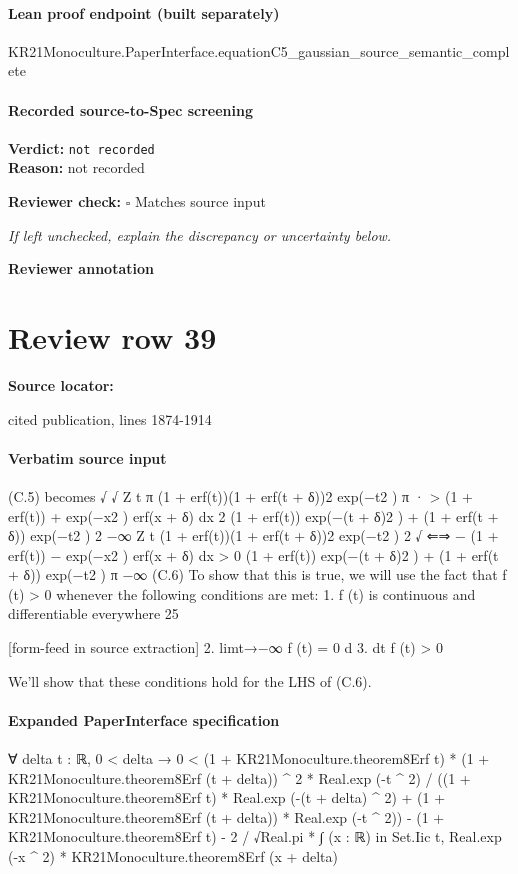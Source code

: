 \documentclass[10pt]{article}
\newcommand{\reviewerbox}{%
  \par\noindent\fbox{\parbox{0.96\linewidth}{\rule{0pt}{0.38in}}}\par
}
\newcommand{\reviewmatch}[1]{%
  \par\noindent\textbf{Reviewer check:} $\square$\; #1\par
  \noindent\emph{If left unchecked, explain the discrepancy or uncertainty below.}\par
}
\begin{document}
\paragraph{Lean proof endpoint (built separately)}\begin{ReviewVerbatim}
KR21Monoculture.PaperInterface.equationC5_gaussian_source_semantic_complete
\end{ReviewVerbatim}

\paragraph{Recorded source-to-Spec screening}
\textbf{Verdict:} \texttt{not recorded}
\\
\textbf{Reason:} not recorded
\reviewmatch{Matches source input}
\noindent\textbf{Reviewer annotation}\par
\reviewerbox
\clearpage
\hypertarget{source-claim-c25f59d1a0e8be35}{}
\section*{Review row 39}
\textbf{Source locator:} {\footnotesize\raggedright cited publication, lines 1874-\allowbreak{}1914\par}
\paragraph{Verbatim source input}
\begin{ReviewVerbatim}
(C.5) becomes
√
√
Z t
π
(1 + erf(t))(1 + erf(t + δ))2 exp(−t2 )
π
·
>
(1
+
erf(t))
+
exp(−x2 ) erf(x + δ) dx
2 (1 + erf(t)) exp(−(t + δ)2 ) + (1 + erf(t + δ)) exp(−t2 )
2
−∞
Z t
(1 + erf(t))(1 + erf(t + δ))2 exp(−t2 )
2
√
⇐⇒
−
(1
+
erf(t))
−
exp(−x2 ) erf(x + δ) dx > 0
(1 + erf(t)) exp(−(t + δ)2 ) + (1 + erf(t + δ)) exp(−t2 )
π −∞
(C.6)
To show that this is true, we will use the fact that f (t) > 0 whenever the following conditions are met:
1. f (t) is continuous and differentiable everywhere
25


[form-feed in source extraction]
2. limt→−∞ f (t) = 0
d
3. dt
f (t) > 0

We’ll show that these conditions hold for the LHS of (C.6).
\end{ReviewVerbatim}


\paragraph{Expanded PaperInterface specification}
\begin{ReviewVerbatim}
∀ {delta t : ℝ},
  0 < delta →
    0 <
      (1 + KR21Monoculture.theorem8Erf t) * (1 + KR21Monoculture.theorem8Erf (t + delta)) ^ 2 * Real.exp (-t ^ 2) /
            ((1 + KR21Monoculture.theorem8Erf t) * Real.exp (-(t + delta) ^ 2) +
              (1 + KR21Monoculture.theorem8Erf (t + delta)) * Real.exp (-t ^ 2)) -
          (1 + KR21Monoculture.theorem8Erf t) -
        2 / √Real.pi * ∫ (x : ℝ) in Set.Iic t, Real.exp (-x ^ 2) * KR21Monoculture.theorem8Erf (x + delta)
\end{ReviewVerbatim}
\end{document}
